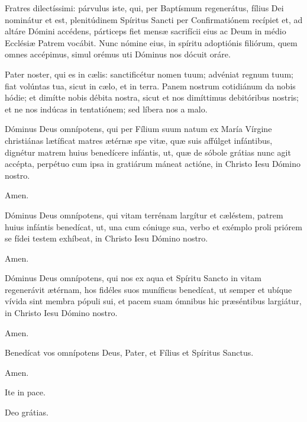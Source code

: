 

Fratres dilectíssimi: párvulus iste, qui, per Baptísmum regenerátus,
fílius Dei nominátur et est, plenitúdinem Spíritus
Sancti per Confirmatiónem recípiet et, ad altáre Dómini accédens,
párticeps fiet mensæ sacrifícii eius ac Deum in médio
Ecclésiæ Patrem vocábit. Nunc nómine eius, in spíritu adoptiónis
filiórum, quem omnes accépimus, simul orémus uti Dóminus nos dócuit
oráre.

Pater noster, qui es in cælis:
sanctificétur nomen tuum;
advéniat regnum tuum;
fiat volúntas tua, sicut in cælo, et in terra.
Panem nostrum cotidiánum da nobis hódie;
et dimítte nobis débita nostra,
sicut et nos dimíttimus debitóribus nostris;
et ne nos indúcas in tentatiónem;
sed líbera nos a malo.



Dóminus Deus omnípotens, qui per Fílium suum natum ex María Vírgine christiánas
lætíficat matres ætérnæ spe vitæ, quæ suis affúlget infántibus, dignétur matrem huius
benedícere infántis, ut, quæ de sóbole grátias nunc agit accépta, perpétuo cum ipsa
in gratiárum máneat actióne, in Christo Iesu Dómino nostro.

 Amen.

 Dóminus Deus omnípotens, qui vitam terrénam largítur et cæléstem, patrem huius infántis
benedícat, ut, una cum cóniuge sua, verbo et exémplo proli priórem se fídei testem exhíbeat,
in Christo Iesu Dómino nostro.

 Amen.

 Dóminus Deus omnípotens, qui nos ex aqua et Spíritu Sancto in vitam regenerávit
ætérnam, hos fidéles suos muníficus benedícat, ut semper et ubíque vívida sint membra pópuli sui,
et pacem suam ómnibus hic præséntibus largiátur, in Christo Iesu Dómino nostro.

 Amen.

 Benedícat vos omnípotens Deus,
Pater, et Fílius \grecross{} et Spíritus Sanctus.

 Amen.

 Ite in pace.

 Deo grátias.
